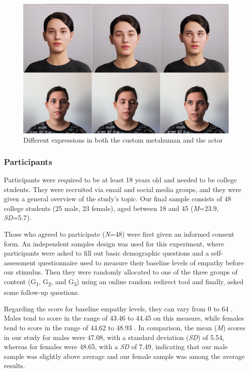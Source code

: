 \begin{figure}[h!]
\includegraphics[width=\textwidth]{figures/personavatar.jpg}
\centering
\caption{Different expressions in both the custom metahuman and the actor}
\label{fig:customMeta}
\end{figure}

\subsubsection{Participants}
Participants were required to be at least 18 years old and needed to be college students. They were recruited via email and social media groups, and they were given a general overview of the study's topic. Our final sample consists of 48 college students (25 male, 23 female), aged between 18 and 45 (\textit{M}=23.9, \textit{SD}=5.7).

Those who agreed to participate (\textit{N}=48) were first given an informed consent form. An independent samples design was used for this experiment, where participants were asked to fill out basic demographic questions and a self-assessment questionnaire \cite{SPR03} used to measure their baseline levels of empathy before our stimulus. Then they were randomly allocated to one of the three groups of content (G\textsubscript{1}, G\textsubscript{2}, and G\textsubscript{3}) using an online random redirect tool \cite{FER19} and finally, asked some follow-up questions.

Regarding the score for baseline empathy levels, they can vary from 0 to 64 \cite{SPR09}. Males tend to score in the range of 43.46 to 44.45 on this measure, while females tend to score in the range of 44.62 to 48.93 \cite{SPR09}. In comparison, the mean (\textit{M}) scores in our study for males were 47.08, with a standard deviation (\textit{SD}) of 5.54, whereas for females were 48.65, with a \textit{SD} of 7.49, indicating that our male sample was slightly above average and our female sample was among the average results.

